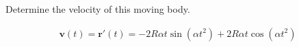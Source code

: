 Determine the velocity of this moving body.

\begin{solution}
\begin{align*}
    \boldsymbol{v}(t) = \boldsymbol{r}'(t) = -2R\alpha t \sin\left(\alpha t^2\right) + 2R\alpha t \cos\left(\alpha t^2\right)
\end{align*}
\end{solution}